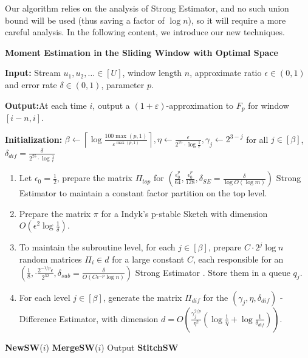 \documentclass{article}
\newcommand{\est}{\textsf{Strong Estimator }}
\newcommand{\estt}{\textsf{Strong Estimator}}
\newcommand{\ind}{\textsf{Indyk's p-stable Sketch }}
\newcommand{\diff}{\textsf{Difference Estimator}}
\theoremstyle{plain}
\begin{document}
Our algorithm relies on the analysis of \estt, and no such union bound will be used (thus saving a factor of $\log n$), so it will require a more careful analysis. In the following content, we introduce our new techniques. 



\begin{algorithm}[H]
\caption{\textbf{\textsf{Moment Estimation in the Sliding Window with Optimal Space}}}
\label{alg2}
\textbf{Input:} Stream $u_1, u_2, \dots \in [U] $, window length $n$, approximate ratio $\epsilon \in (0, 1)$ and error rate $\delta \in (0,1)$, parameter $p$.

 \textbf{Output:}At each time $i$, output a
 $(1+\varepsilon)$-approximation to $F_p$ for window $[i - n, i]$.

 \textbf{Initialization:} $\beta \gets \left\lceil \log \frac{100 \max(p, 1)}{\varepsilon^{\max(p, 1)}} \right\rceil, \eta \gets \frac{\epsilon}{2 ^ {25}\cdot \log \frac 1{\epsilon}}, \gamma_j \gets 2^{3-j}$ for all $j \in [\beta]$, $\delta_{dif} = \frac{\delta}{2 ^ {25}\cdot \log \frac 1{\epsilon}}$

 \begin{enumerate}
     \item Let $\epsilon_0 = \frac 12$, prepare the matrix $\Pi_{top}$ for $(\frac{\epsilon_0 ^ p}{64}, \frac{\epsilon_0 ^ p}{128}, \delta_{SE}=\frac{\delta}{\log O(\log m)})$ \est to maintain a constant factor partition on the top level.

     \item Prepare the matrix $\pi$ for a \ind with dimension $O(\epsilon ^ 2 \log \frac 1{\delta})$.

     \item  To maintain the subroutine level, for each $j\in [\beta]$, prepare $C\cdot 2 ^ j\log n$ random matrices $\Pi_i \in d$ for a large constant $C$, each responsible for an $(\frac 18, \cdot \frac{2 ^ {-1/p} \epsilon}{2 ^ {32}}, \delta_{sub} = \frac{\delta}{O(C\epsilon ^ {-p} \log n)})$ \est. Store them in a queue $q_j$.

     \item For each level $j \in [\beta]$, generate the matrix $\Pi_{dif}$ for the $(\gamma_j, \eta, \delta_{dif})$ -\diff, with dimension $d = O(\frac{\gamma_j ^ {2/p}}{\eta ^ 2} (\log \frac 1{\eta} + \log \frac 1{\delta_{dif}}))$.
 \end{enumerate}


\noindent\makebox[\linewidth]{\rule{\paperwidth-10cm}{0.4pt}}

\begin{algorithmic}[1]
    \State \textbf{NewSW}($i$) 
    \State \textbf{MergeSW}($i$) 
    \State Output \textbf{StitchSW}
\EndFor
\end{algorithmic}
\end{algorithm}
\end{document}
